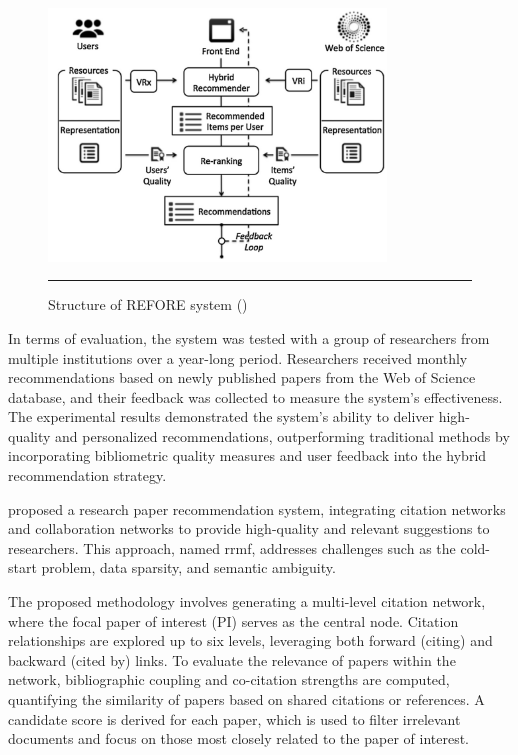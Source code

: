 \begin{figure}[htbp]
    \centering
 \includegraphics[width=0.8\textwidth]{03_Figures/literature-review/refore.png}
     \rule{35em}{0.5pt}
    \caption{Structure of REFORE system (\textcite{refore})}
 \label{fig:refore}
\end{figure}

In terms of evaluation, the system was tested with a group of researchers from multiple institutions over a year-long period.
Researchers received monthly recommendations based on newly published papers from the Web of Science database, and their feedback was collected to measure the system's effectiveness.
The experimental results demonstrated the system's ability to deliver high-quality and personalized recommendations, outperforming traditional methods by incorporating bibliometric quality measures and user feedback into the hybrid recommendation strategy.

\textcite{Kanwal2024} proposed a research paper recommendation system, integrating citation networks and collaboration networks to provide high-quality and relevant suggestions to researchers.
This approach, named \gls{rrmf}, addresses challenges such as the cold-start problem, data sparsity, and semantic ambiguity.

The proposed methodology involves generating a multi-level citation network, where the focal paper of interest (PI) serves as the central node.
Citation relationships are explored up to six levels, leveraging both forward (citing) and backward (cited by) links.
To evaluate the relevance of papers within the network, bibliographic coupling and co-citation strengths are computed, quantifying the similarity of papers based on shared citations or references.
A candidate score is derived for each paper, which is used to filter irrelevant documents and focus on those most closely related to the paper of interest.

